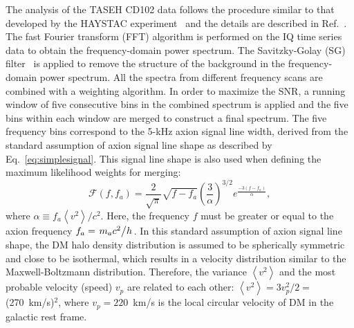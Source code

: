 \documentclass[%
 reprint,prl, %
superscriptaddress,
 amsmath,amssymb,
 aps,
]{revtex4-2}
\newcommand{\ma}{\ensuremath{m_a}}
\begin{document}
   The analysis of the TASEH CD102 data follows the procedure similar to that 
developed by the HAYSTAC experiment~\cite{HAYSTACII} and the details are 
described in Ref.~\cite{TASEHAnalysis}. The fast Fourier transform (FFT) 
algorithm is performed on the IQ time series data to obtain the 
frequency-domain power spectrum. 
The Savitzky-Golay (SG) 
filter~\cite{SGFilter} is applied to remove the structure of the background 
in the frequency-domain power spectrum. All the spectra from different 
frequency scans are combined with a weighting algorithm. 
In order to maximize the SNR, a running window of 
five consecutive bins in the combined spectrum is applied and the five bins 
within each window are merged to construct a final spectrum. 
The five frequency bins correspond to the 5-kHz axion signal line width,  
derived from the standard assumption of axion signal line shape as described 
by Eq.~\eqref{eq:simplesignal}. 
This signal line shape is also used when defining the maximum likelihood 
weights for merging: 
\begin{equation}
\mathcal{F}(f, f_a) = \frac{2}{\sqrt{\pi}}\sqrt{f-f_a}\left(\frac{3}{\alpha}\right)^{3/2}
e^{\frac{-3\left(f-f_a\right)}{\alpha}},
\label{eq:simplesignal}
\end{equation}
where $\alpha\equiv  f_a \left<v^2\right>/c^2$. 
Here, the frequency $f$ must be greater or equal to the axion frequency 
$f_a=\left.\ma c^2\middle/h\right.$. 
In this standard assumption of axion signal line shape, 
the DM halo density distribution is assumed 
to be spherically symmetric and close to be isothermal, which results in a 
velocity distribution similar to the Maxwell-Boltzmann distribution. 
Therefore, the variance $\left<v^2\right>$ and the most probable velocity
(speed) $v_p$ are related to each other:
$\left<v^2\right>=3v_p^2/2=$(270~km/s)$^2$, where $v_p=220$~km/s is the local
circular velocity of DM in the galactic rest frame. 
\end{document}
